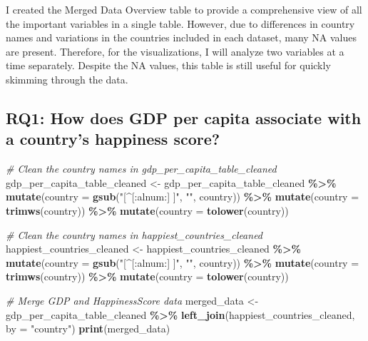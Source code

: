 \documentclass[
]{article}
\newenvironment{Shaded}{\begin{snugshade}}{\end{snugshade}}
\newcommand{\AttributeTok}[1]{\textcolor[rgb]{0.13,0.29,0.53}{#1}}
\newcommand{\CommentTok}[1]{\textcolor[rgb]{0.56,0.35,0.01}{\textit{#1}}}
\newcommand{\FunctionTok}[1]{\textcolor[rgb]{0.13,0.29,0.53}{\textbf{#1}}}
\newcommand{\NormalTok}[1]{#1}
\newcommand{\OtherTok}[1]{\textcolor[rgb]{0.56,0.35,0.01}{#1}}
\newcommand{\SpecialCharTok}[1]{\textcolor[rgb]{0.81,0.36,0.00}{\textbf{#1}}}
\newcommand{\StringTok}[1]{\textcolor[rgb]{0.31,0.60,0.02}{#1}}
\begin{document}
I created the Merged Data Overview table to provide a comprehensive view
of all the important variables in a single table. However, due to
differences in country names and variations in the countries included in
each dataset, many NA values are present. Therefore, for the
visualizations, I will analyze two variables at a time separately.
Despite the NA values, this table is still useful for quickly skimming
through the data.

\subsection{RQ1: How does GDP per capita associate with a country's
happiness
score?}\label{rq1-how-does-gdp-per-capita-associate-with-a-countrys-happiness-score}

\begin{Shaded}
\begin{Highlighting}[]
\CommentTok{\# Clean the country names in gdp\_per\_capita\_table\_cleaned}
\NormalTok{gdp\_per\_capita\_table\_cleaned }\OtherTok{\textless{}{-}}\NormalTok{ gdp\_per\_capita\_table\_cleaned }\SpecialCharTok{\%\textgreater{}\%}
  \FunctionTok{mutate}\NormalTok{(}\AttributeTok{country =} \FunctionTok{gsub}\NormalTok{(}\StringTok{"[\^{}[:alnum:] ]"}\NormalTok{, }\StringTok{""}\NormalTok{, country)) }\SpecialCharTok{\%\textgreater{}\%}  
  \FunctionTok{mutate}\NormalTok{(}\AttributeTok{country =} \FunctionTok{trimws}\NormalTok{(country)) }\SpecialCharTok{\%\textgreater{}\%}                   
  \FunctionTok{mutate}\NormalTok{(}\AttributeTok{country =} \FunctionTok{tolower}\NormalTok{(country))                      }

\CommentTok{\# Clean the country names in happiest\_countries\_cleaned}
\NormalTok{happiest\_countries\_cleaned }\OtherTok{\textless{}{-}}\NormalTok{ happiest\_countries\_cleaned }\SpecialCharTok{\%\textgreater{}\%}
  \FunctionTok{mutate}\NormalTok{(}\AttributeTok{country =} \FunctionTok{gsub}\NormalTok{(}\StringTok{"[\^{}[:alnum:] ]"}\NormalTok{, }\StringTok{""}\NormalTok{, country)) }\SpecialCharTok{\%\textgreater{}\%}  
  \FunctionTok{mutate}\NormalTok{(}\AttributeTok{country =} \FunctionTok{trimws}\NormalTok{(country)) }\SpecialCharTok{\%\textgreater{}\%}                    
  \FunctionTok{mutate}\NormalTok{(}\AttributeTok{country =} \FunctionTok{tolower}\NormalTok{(country))                     }

\CommentTok{\# Merge GDP and HappinessScore data}
\NormalTok{merged\_data }\OtherTok{\textless{}{-}}\NormalTok{ gdp\_per\_capita\_table\_cleaned }\SpecialCharTok{\%\textgreater{}\%}
  \FunctionTok{left\_join}\NormalTok{(happiest\_countries\_cleaned, }\AttributeTok{by =} \StringTok{"country"}\NormalTok{)}
\FunctionTok{print}\NormalTok{(merged\_data)}
\end{Highlighting}
\end{Shaded}
\end{document}
